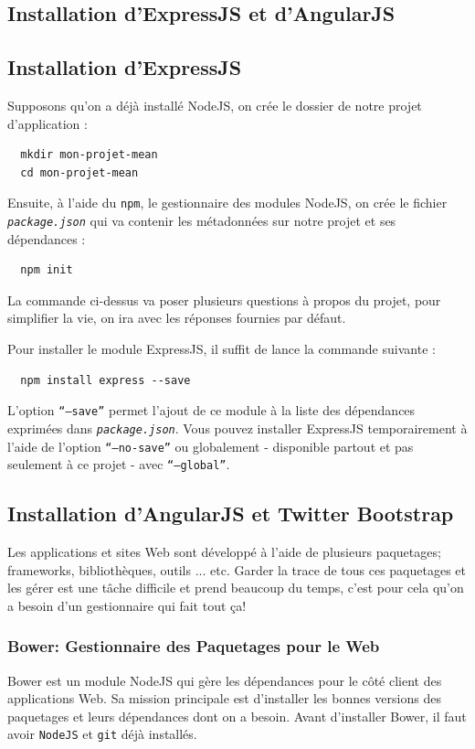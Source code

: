 \documentclass[a4paper,11pt,oneside]{report}
\begin{document}
\begin{appendices}
\section{Installation d'ExpressJS et d'AngularJS}

\subsection{Installation d'ExpressJS}
Supposons qu'on a déjà installé NodeJS, on crée le dossier de notre projet d'application :
  \begin{verbatim}
  mkdir mon-projet-mean
  cd mon-projet-mean
  \end{verbatim}

Ensuite, à l'aide du \texttt{npm}, le gestionnaire des modules NodeJS, on crée le fichier \texttt{\emph{package.json}} qui va contenir les métadonnées sur notre projet et ses dépendances :
  \begin{verbatim}
  npm init
  \end{verbatim}
La commande ci-dessus va poser plusieurs questions à propos du projet, pour simplifier la vie, on ira avec les réponses fournies par défaut.

Pour installer le module ExpressJS, il suffit de lance la commande suivante :
  \begin{verbatim}
  npm install express --save
  \end{verbatim}
L'option \texttt{``---save''} permet l'ajout de ce module à la liste des dépendances exprimées dans \texttt{\emph{package.json}}. Vous pouvez installer ExpressJS temporairement à l'aide de l'option \texttt{``---no-save''} ou globalement - disponible partout et pas seulement à ce projet - avec \texttt{``---global''}.

\subsection{Installation d'AngularJS et Twitter Bootstrap}
Les applications et sites Web sont développé à l'aide de plusieurs paquetages; frameworks, bibliothèques, outils ... etc. Garder la trace de tous ces paquetages et les gérer est une tâche difficile et prend beaucoup du temps, c'est pour cela qu'on a besoin d'un gestionnaire qui fait tout ça!

\subsubsection{Bower: Gestionnaire des Paquetages pour le Web}
Bower est un module NodeJS qui gère les dépendances pour le côté client des applications Web. Sa mission principale est d'installer les bonnes versions des paquetages et leurs dépendances dont on a besoin. Avant d'installer Bower, il faut avoir \texttt{NodeJS} et \texttt{git} déjà installés.
\newline


\end{appendices}
\end{document}
